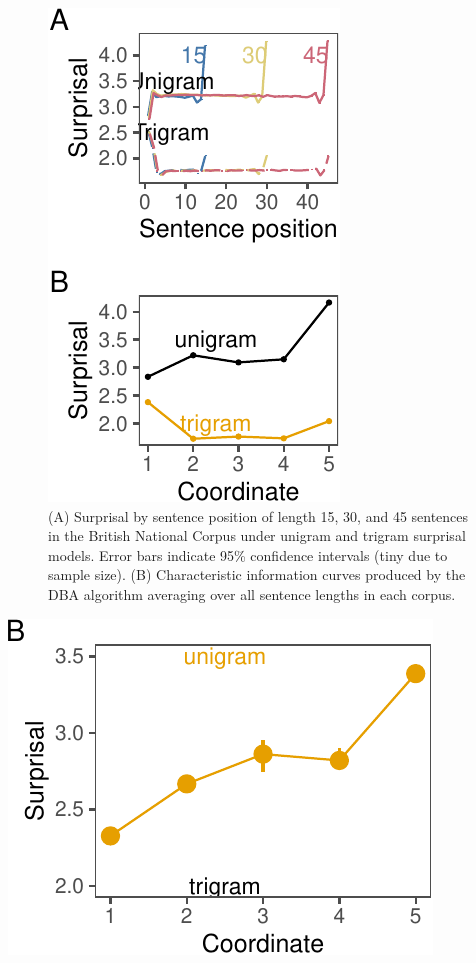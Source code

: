 \documentclass[
  english,
  man,floatsintext]{apa6}
\begin{document}
\begin{figure}[tb]

{\centering \includegraphics{figs/bncplots-1} 

}

\caption{(A) Surprisal by sentence position of length 15, 30, and 45 sentences in the British National Corpus under unigram and trigram surprisal models. Error bars indicate 95\% confidence intervals (tiny due to sample size). (B) Characteristic information curves produced by the DBA algorithm averaging over all sentence lengths in each corpus. }\label{fig:bncplots}
\end{figure}

\includegraphics{figs/unnamed-chunk-1-1.pdf}
\end{document}

